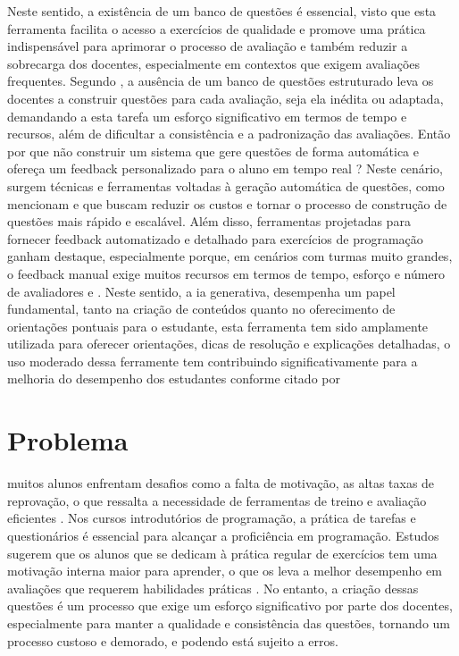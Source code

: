 Neste sentido, a existência de um banco de questões é essencial, visto que esta ferramenta facilita o acesso a exercícios de qualidade e promove uma prática indispensável para aprimorar o processo de avaliação e também reduzir a sobrecarga dos docentes, especialmente em contextos que exigem avaliações frequentes. Segundo   \parencite{Puthiaparampil2020} , a ausência de um banco de questões estruturado leva os docentes a construir questões  para cada avaliação, seja ela inédita ou adaptada,  demandando a esta tarefa um esforço significativo em termos de tempo e recursos, além de dificultar a consistência e a padronização das avaliações. Então por que não construir um sistema que gere questões de forma automática e ofereça um feedback personalizado para o aluno em tempo real ? Neste cenário, surgem técnicas e ferramentas voltadas à geração automática de questões, como mencionam \parencite{kurdi2020} e \parencite{sewunetie2022}  que buscam reduzir os custos e tornar o processo de construção de questões mais rápido e escalável. Além disso, ferramentas projetadas para fornecer feedback automatizado e detalhado para exercícios de programação ganham destaque, especialmente porque, em cenários com turmas muito grandes, o feedback manual exige muitos recursos em termos de tempo, esforço e número de avaliadores \parencite{vanpraet2024} e \parencite{fung2024}.   Neste sentido, a \gls{ia} generativa, desempenha um papel fundamental, tanto na criação de conteúdos quanto no oferecimento de orientações pontuais para o estudante, esta ferramenta tem sido amplamente utilizada para oferecer orientações, dicas de resolução e explicações detalhadas, o uso moderado dessa ferramente tem contribuindo significativamente para a melhoria do desempenho dos estudantes conforme citado por \parencite{yang2024}


\section{Problema}
muitos alunos enfrentam desafios como a falta de motivação, as altas taxas de reprovação, o que ressalta a necessidade de ferramentas de treino e avaliação eficientes \parencite{mbiada2022}. Nos cursos introdutórios de programação, a prática de  tarefas e questionários é essencial para alcançar a proficiência em programação. Estudos sugerem que os alunos que se dedicam à prática regular de exercícios tem uma motivação interna maior para aprender, o que os leva a melhor desempenho em avaliações que requerem habilidades práticas \parencite{Edwards2019}. No entanto, a criação dessas questões é um processo que exige um esforço significativo por parte dos docentes, especialmente para manter a qualidade e consistência das questões, tornando um processo custoso e demorado, e podendo está  sujeito a erros.

